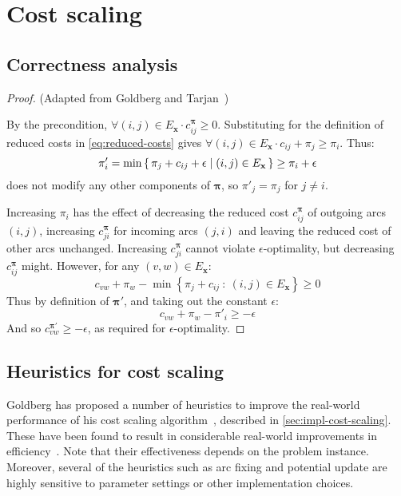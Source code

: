 \section{Cost scaling} \label{appendix:impl-cs}

\subsection{Correctness analysis} \label{appendix:impl-cs:correctness}

\csrelabelcorrectness*
\begin{proof} (Adapted from Goldberg and Tarjan~\cite[lemma~5.2]{Goldberg:1987})
    
    By the precondition, $\forall(i,j) \in E_{\mathbf{x}} \cdot c^{\boldsymbol{\pi}}_{ij} \geq 0$. Substituting for the definition of reduced costs in \cref{eq:reduced-costs} gives $\forall(i,j) \in E_{\mathbf{x}} \cdot c_{ij} + \pi_j \geq \pi_i$. Thus:
    \[\pi'_i = \min \set{\pi_j + c_{ij} + \epsilon | (i,j) \in E_{\mathbf{x}}} \geq \pi_i + \epsilon\]
     does not modify any other components of $\boldsymbol{\pi}$, so $\pi'_j = \pi_j$ for $j \neq i$.
    
    Increasing $\pi_i$ has the effect of decreasing the reduced cost $c^{\boldsymbol{\pi}}_{ij}$ of outgoing arcs $(i,j)$, increasing $c^{\boldsymbol{\pi}}_{ji}$ for incoming arcs $(j,i)$ and leaving the reduced cost of other arcs unchanged. Increasing $c^{\boldsymbol{\pi}}_{ji}$ cannot violate $\epsilon$-optimality, but decreasing $c^{\boldsymbol{\pi}}_{ij}$ might. However, for any $(v,w) \in E_{\mathbf{x}}$:
    \[c_{vw} + \pi_w - \min \left\{\pi_j + c_{ij} \::\: (i,j) \in E_{\mathbf{x}}\right\} \geq 0\]
    Thus by definition of $\boldsymbol{\pi}'$, and taking out the constant $\epsilon$:
    \[c_{vw} + \pi_w - \pi'_i \geq -\epsilon\]
    And so $c_{vw}^{\boldsymbol{\pi}'} \geq -\epsilon$, as required for $\epsilon$-optimality.
\end{proof}

\subsection{Heuristics for cost scaling} \label{appendix:impl-csheuristics}
Goldberg has proposed a number of heuristics to improve the real-world performance of his cost scaling algorithm~\cite{Goldberg:1997}, described in \cref{sec:impl-cost-scaling}. These have been found to result in considerable real-world improvements in efficiency~\cite{Bunnagel:1998,KiralyKovacs:2012}. Note that their effectiveness depends on the problem instance. Moreover, several of the heuristics such as arc fixing and potential update are highly sensitive to parameter settings or other implementation choices.

